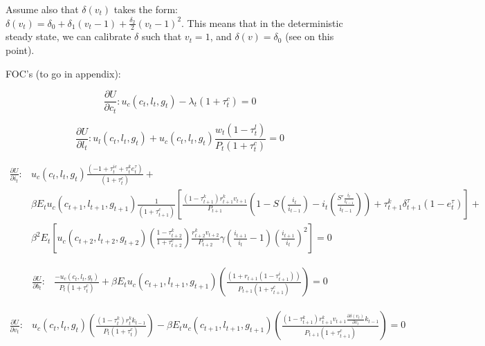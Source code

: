 \documentclass[article,11pt,letterpaper,fleqn]{article}
\theoremstyle{definition}
\numberwithin{equation}{section}
\newcommand{\cn}{\citeasnoun} %
\begin{document}
Assume also that $\delta(v_{t})$ takes the form: $\delta(v_{t})=\delta_{0}+\delta_{1}(v_{t}-1) + \frac{\delta_{2}}{2}(v_{t}-1)^2$.  This means that in the deterministic steady state, we can calibrate $\delta$ such that $v_{t}=1$, and $\delta(v)=\delta_{0}$ (see \cn{TY2010} on this point).


FOC's (to go in appendix):

\begin{equation}
\frac{\partial U}{\partial c_{t}}: u_{c}(c_{t},l_{t},g_{t})- \lambda_{t}(1+\tau_{t}^{c}) = 0
\end{equation}

\begin{equation}
\frac{\partial U}{\partial l_{t}}: u_{l}(c_{t},l_{t},g_{t})+u_{c}(c_{t},l_{t},g_{t})\frac{w_{t}(1-\tau_{t}^{l})}{P_{t}(1+\tau_{t}^{c})}  = 0
\end{equation}


 \begin{equation}
\begin{split}
\frac{\partial U}{\partial i_{t}}: & u_{c}(c_{t},l_{t},g_{t})\frac{(-1+\tau_{t}^{ic}+\tau_{t}^{k}e_{t}^{\tau})}{(1+\tau_{t}^{c})} + \\
& \beta E_{t}u_{c}(c_{t+1},l_{t+1},g_{t+1})\frac{1}{(1+\tau_{t+1}^{c})}\left[\frac{(1-\tau_{t+1}^{k})r_{t+1}^{k}v_{t+1}}{P_{t+1}}\left(1-S\left(\frac{i_{t}}{i_{t-1}}\right)-i_{t}\left(\frac{S'\frac{i_{t}}{i_{t-1}}}{i_{t-1}}\right)\right)+\tau_{t+1}^{k}\delta_{t+1}^{\tau}(1-e_{t}^{\tau})\right] + \\
&  \beta^{2}E_{t}\left[u_{c}(c_{t+2},l_{t+2},g_{t+2})\left(\frac{1-\tau_{t+2}^{k}}{1+\tau_{t+2}^{c}}\right)\frac{r_{t+2}^{k}v_{t+2}}{P_{t+2}}\gamma\left(\frac{i_{t+1}}{i_{t}}-1\right)\left(\frac{i_{t+1}}{i_{t}}\right)^{2}\right]= 0
  \end{split}
  \end{equation}


\begin{equation}
\begin{split}
\frac{\partial U}{\partial b_{t}}: & \frac{-u_{c}(c_{t},l_{t},g_{t})}{P_{t}(1+\tau_{t}^{c})}  +
\beta E_{t}u_{c}(c_{t+1},l_{t+1},g_{t+1})\left(\frac{(1+r_{t+1}(1-\tau_{t+1}^{i}))}{P_{t+1}(1+\tau_{t+1}^{c})}\right)  = 0
\end{split}
\end{equation}

\begin{equation}
\begin{split}
\frac{\partial U}{\partial v_{t}}: & u_{c}(c_{t},l_{t},g_{t})\left(\frac{(1-\tau_{t}^{k})r_{t}^{k}k_{t-1}}{P_{t}(1+\tau_{t}^{c})}\right) - \beta E_{t}u_{c}(c_{t+1},l_{t+1},g_{t+1})\left(\frac{(1-\tau_{t+1}^{k})r_{t+1}^{k}v_{t+1}\frac{\partial \delta(v_{t})}{\partial v_{t}}k_{t-1}}{P_{t+1}(1+\tau_{t+1}^{c})}\right)  = 0
\end{split}
\end{equation}
\end{document}
